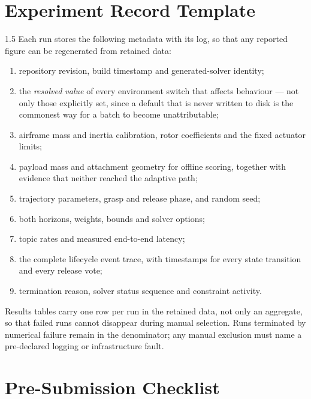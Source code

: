 \begin{appendices}
\clearpage
\chapter{Experiment Record Template}

\begin{spacing}{1.5}
Each run stores the following metadata with its log, so that any reported figure
can be regenerated from retained data:
\begin{enumerate}
\item repository revision, build timestamp and generated-solver identity;
\item the \emph{resolved value} of every environment switch that affects
behaviour --- not only those explicitly set, since a default that is never
written to disk is the commonest way for a batch to become unattributable;
\item airframe mass and inertia calibration, rotor coefficients and the fixed
actuator limits;
\item payload mass and attachment geometry for offline scoring, together with
evidence that neither reached the adaptive path;
\item trajectory parameters, grasp and release phase, and random seed;
\item both horizons, weights, bounds and solver options;
\item topic rates and measured end-to-end latency;
\item the complete lifecycle event trace, with timestamps for every state
transition and every release vote;
\item termination reason, solver status sequence and constraint activity.
\end{enumerate}

Results tables carry one row per run in the retained data, not only an aggregate,
so that failed runs cannot disappear during manual selection. Runs terminated by
numerical failure remain in the denominator; any manual exclusion must name a
pre-declared logging or infrastructure fault.
\end{spacing}

\clearpage
\chapter{Pre-Submission Checklist}


\end{appendices}
